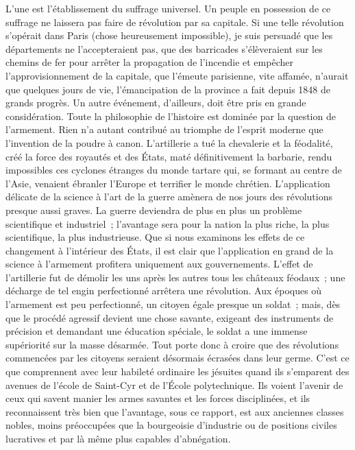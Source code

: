 \documentclass[french,twoside]{book} %
\begin{document}
L’une est l’établissement du suffrage universel. Un peuple en possession de ce suffrage ne laissera pas faire de révolution par sa capitale. Si une telle révolution s’opérait dans Paris (chose heureusement impossible), je suis persuadé que les départements ne l’accepteraient pas, que des barricades s’élèveraient sur les chemins de fer pour arrêter la propagation de l’incendie et empêcher l’approvisionnement de la capitale, que l’émeute parisienne, vite affamée, n’aurait que quelques jours de vie, l’émancipation de la province a fait depuis 1848 de grands progrès. Un autre événement, d’ailleurs, doit être pris en grande considération. Toute la philosophie de l’histoire est dominée par la question de l’armement. Rien n’a autant contribué au triomphe de l’esprit moderne que l’invention de la poudre à canon. L’artillerie a tué la chevalerie et la féodalité, créé la force des royautés et des États, maté définitivement la barbarie, rendu impossibles ces cyclones étranges du monde tartare qui, se formant au centre de l’Asie, venaient ébranler l’Europe et terrifier le monde chrétien. L’application délicate de la science à l’art de la guerre amènera de nos jours des révolutions presque aussi graves. La guerre deviendra de plus en plus un problème scientifique et industriel ; l’avantage sera pour la nation la plus riche, la plus scientifique, la plus industrieuse. Que si nous examinons les effets de ce changement à l’intérieur des États, il est clair que l’application en grand de la science à l’armement profitera uniquement aux gouvernements. L’effet de l’artillerie fut de démolir les uns après les autres tous les châteaux féodaux ; une décharge de tel engin perfectionné arrêtera une révolution. Aux époques où l’armement est peu perfectionné, un citoyen égale presque un soldat ; mais, dès que le procédé agressif devient une chose savante, exigeant des instruments de précision et demandant une éducation spéciale, le soldat a une immense supériorité sur la masse désarmée. Tout porte donc à croire que des révolutions commencées par les citoyens seraient désormais écrasées dans leur germe. C’est ce que comprennent avec leur habileté ordinaire les jésuites quand ils s’emparent des avenues de l’école de Saint-Cyr et de l’École polytechnique. Ils voient l’avenir de ceux qui savent manier les armes savantes et les forces disciplinées, et ils reconnaissent très bien que l’avantage, sous ce rapport, est aux anciennes classes nobles, moins préoccupées que la bourgeoisie d’industrie ou de positions civiles lucratives et par là même plus capables d’abnégation.\par
\end{document}
